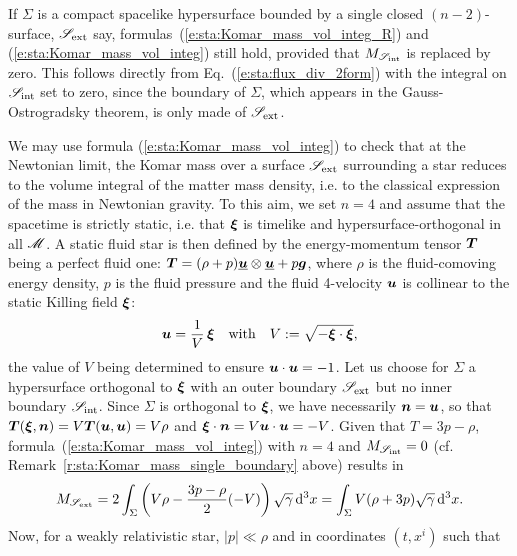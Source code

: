 \begin{remark}
\label{r:sta:Komar_mass_single_boundary}
If $\Sigma$ is a compact spacelike hypersurface bounded by a single closed
$(n-2)$-surface, $\mathscr{S}_{\rm ext}$ say, formulas~(\ref{e:sta:Komar_mass_vol_integ_R}) and (\ref{e:sta:Komar_mass_vol_integ})
still hold, provided that $M_{\mathscr{S}_{\rm int}}$ is replaced by zero. This follows
directly from Eq.~(\ref{e:sta:flux_div_2form}) with the integral on $\mathscr{S}_{\rm int}$
set to zero, since the boundary of $\Sigma$, which appears in the
Gauss-Ostrogradsky theorem, is only made of $\mathscr{S}_{\rm ext}$.
\end{remark}

\begin{example}
\label{x:sta:Komar_mass_star}
We may use formula (\ref{e:sta:Komar_mass_vol_integ})
to check that at the Newtonian limit, the Komar mass over
a surface $\mathscr{S}_{\rm ext}$ surrounding a star
reduces to the volume integral of the matter mass density,
i.e. to the classical expression of the mass
in Newtonian gravity.
To this aim, we set $n=4$ and assume that the spacetime is strictly static, i.e. that $\bm{\xi}$
is timelike and hypersurface-orthogonal in all $\mathscr{M}$.
A static fluid star is then
defined by the energy-momentum tensor $\bm{T}$ being
a perfect fluid one:
$\bm{T} = (\rho + p)\underline{\bm{u}} \otimes \underline{\bm{u}} + p \bm{g}$, where
$\rho$ is the fluid-comoving energy density,
$p$ is the fluid pressure and the fluid 4-velocity $\bm{u}$ is collinear to the
static Killing field $\bm{\xi}$:
\[
    \bm{u} = \frac{1}{V} \, \bm{\xi}
    \quad\mbox{with}\quad
    V := \sqrt{- \bm{\xi}\cdot\bm{\xi} } ,
\]
the value of $V$ being determined to ensure $\bm{u}\cdot\bm{u} = -1$.
Let us choose for $\Sigma$ a hypersurface orthogonal to $\bm{\xi}$
with an outer boundary  $\mathscr{S}_{\rm ext}$ but no inner boundary $\mathscr{S}_{\rm int}$.
Since $\Sigma$ is orthogonal to $\bm{\xi}$, we have
necessarily $\bm{n} = \bm{u}$, so that $\bm{T}(\bm{\xi},\bm{n}) = V \bm{T}(\bm{u},\bm{u})
= V \rho$ and $\bm{\xi}\cdot\bm{n} = V \bm{u}\cdot\bm{u} = -V$. Given that
$T = 3 p  - \rho$, formula~(\ref{e:sta:Komar_mass_vol_integ}) with $n=4$ and
$M_{\mathscr{S}_{\rm int}} =  0$ (cf. Remark~\ref{r:sta:Komar_mass_single_boundary} above)
results in
\[
    M_{\mathscr{S}_{\rm ext}} = 2
    \int_{\Sigma} \left( V \rho - \frac{3p - \rho}{2}(-V) \right)
    \sqrt{\gamma} \, \mathrm{d}^3 x
    = \int_{\Sigma} V (\rho + 3 p) \sqrt{\gamma} \, \mathrm{d}^3 x .
\]
Now, for a weakly relativistic star, $|p| \ll \rho$ and
 in coordinates $(t, x^i)$ such that

\end{example}

